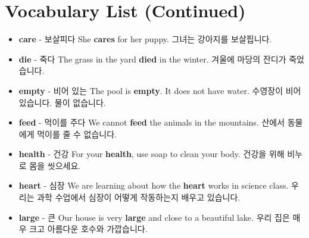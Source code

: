 \documentclass{article}
\begin{document}
\section*{Vocabulary List (Continued)}
\begin{addmargin}[1em]{1em}
    \begin{itemize}
        \item \fontsize{12pt}{14pt}\selectfont \textbf{care} - 보살피다 \newline
        She \textbf{cares} for her puppy. \newline
        그녀는 강아지를 보살핍니다.
        
        \item \fontsize{12pt}{14pt}\selectfont \textbf{die} - 죽다 \newline
        The grass in the yard \textbf{died} in the winter. \newline
        겨울에 마당의 잔디가 죽었습니다.
        
        \item \fontsize{12pt}{14pt}\selectfont \textbf{empty} - 비어 있는 \newline
        The pool is \textbf{empty}. It does not have water. \newline
        수영장이 비어 있습니다. 물이 없습니다.
        
        \item \fontsize{12pt}{14pt}\selectfont \textbf{feed} - 먹이를 주다 \newline
        We cannot \textbf{feed} the animals in the mountains. \newline
        산에서 동물에게 먹이를 줄 수 없습니다.
        
        \item \fontsize{12pt}{14pt}\selectfont \textbf{health} - 건강 \newline
        For your \textbf{health}, use soap to clean your body. \newline
        건강을 위해 비누로 몸을 씻으세요.
        
        \item \fontsize{12pt}{14pt}\selectfont \textbf{heart} - 심장 \newline
        We are learning about how the \textbf{heart} works in science class. \newline
        우리는 과학 수업에서 심장이 어떻게 작동하는지 배우고 있습니다.
        
        \item \fontsize{12pt}{14pt}\selectfont \textbf{large} - 큰 \newline
        Our house is very \textbf{large} and close to a beautiful lake. \newline
        우리 집은 매우 크고 아름다운 호수와 가깝습니다.
        

\end{itemize}
\end{addmargin}
\end{document}
